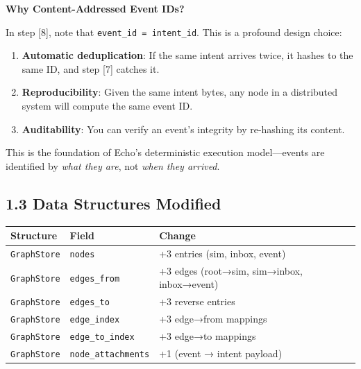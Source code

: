 \documentclass[11pt]{book}
\newcounter{none} %
\begin{document}
\begin{deepdive}
\textbf{Why Content-Addressed Event IDs?}

In step [8], note that \texttt{event\_id = intent\_id}. This is a profound design choice:

\begin{enumerate}
\item \textbf{Automatic deduplication}: If the same intent arrives twice, it hashes to the same ID, and step [7] catches it.
\item \textbf{Reproducibility}: Given the same intent bytes, any node in a distributed system will compute the same event ID.
\item \textbf{Auditability}: You can verify an event's integrity by re-hashing its content.
\end{enumerate}

This is the foundation of Echo's deterministic execution model---events are identified by \emph{what they are}, not \emph{when they arrived}.
\end{deepdive}

\subsection{1.3 Data Structures
Modified}\label{data-structures-modified}

{\def\LTcaptype{none} %
\begin{longtable}[]{@{}
  >{\raggedright\arraybackslash}p{}
  >{\raggedright\arraybackslash}p{}
  >{\raggedright\arraybackslash}p{}@{}}
\toprule\noalign{}
\begin{minipage}[b]{\linewidth}\raggedright
Structure
\end{minipage} & \begin{minipage}[b]{\linewidth}\raggedright
Field
\end{minipage} & \begin{minipage}[b]{\linewidth}\raggedright
Change
\end{minipage} \\
\midrule\noalign{}
\endhead
\bottomrule\noalign{}
\endlastfoot
\texttt{GraphStore} & \texttt{nodes} & +3 entries (sim, inbox, event) \\
\texttt{GraphStore} & \texttt{edges\_from} & +3 edges (root→sim,
sim→inbox, inbox→event) \\
\texttt{GraphStore} & \texttt{edges\_to} & +3 reverse entries \\
\texttt{GraphStore} & \texttt{edge\_index} & +3 edge→from mappings \\
\texttt{GraphStore} & \texttt{edge\_to\_index} & +3 edge→to mappings \\
\texttt{GraphStore} & \texttt{node\_attachments} & +1 (event → intent
payload) \\
\end{longtable}
}
\end{document}
